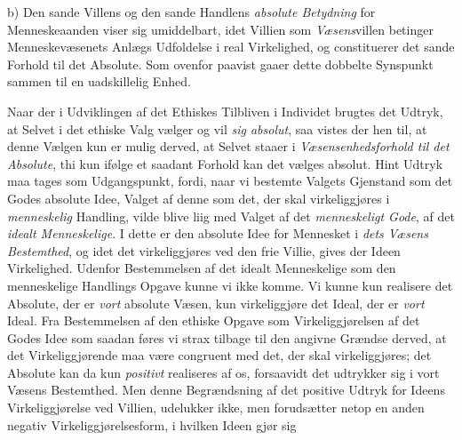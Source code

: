 b) Den sande Villens og den sande Handlens \emph{absolute Betydning} for
Menneskeaanden viser sig umiddelbart, idet Villien som \emph{Væsens}villen
betinger Menneskevæsenets Anlægs Udfoldelse i real Virkelighed, og constituerer
det sande Forhold til det Absolute. Som ovenfor paavist gaaer dette dobbelte
Synspunkt sammen til en uadskillelig Enhed.

Naar der i Udviklingen af det Ethiskes Tilbliven i Individet brugtes det
Udtryk, at Selvet i det ethiske Valg vælger og vil \emph{sig absolut}, saa
vistes der hen til, at denne Vælgen kun er mulig derved, at Selvet staaer i
\emph{Væsensenhedsforhold til det Absolute}, thi kun ifølge et saadant Forhold
kan det vælges absolut. Hint Udtryk maa tages som Udgangspunkt, fordi, naar vi
bestemte Valgets Gjenstand som det Godes absolute Idee, Valget af denne som det,
der skal virkeliggjøres i \emph{menneskelig} Handling, vilde blive liig med
Valget af det \emph{menneskeligt Gode}, af det \emph{idealt Menneskelige}. I
dette er den absolute Idee for Mennesket i \emph{dets Væsens Bestemthed}, og
idet det virkeliggjøres ved den frie Villie, gives der Ideen Virkelighed.
Udenfor Bestemmelsen af det idealt Menneskelige
 som den menneskelige Handlings Opgave kunne vi ikke komme. Vi kunne kun realisere
det Absolute, der er \emph{vort} absolute Væsen, kun virkeliggjøre det Ideal, der
er \emph{vort} Ideal. Fra Bestemmelsen af den ethiske Opgave som
Virkeliggjørelsen af det Godes Idee som saadan føres vi strax tilbage til den
angivne Grændse derved, at det Virkeliggjørende maa være congruent med det, der
skal virkeliggjøres; det Absolute kan da kun \emph{positivt} realiseres af os,
forsaavidt det udtrykker sig i vort Væsens Bestemthed. Men denne Begrændsning af
det positive Udtryk for Ideens Virkeliggjørelse ved Villien, udelukker ikke, men
forudsætter netop en anden negativ Virkeliggjørelsesform, i hvilken Ideen gjør sig
